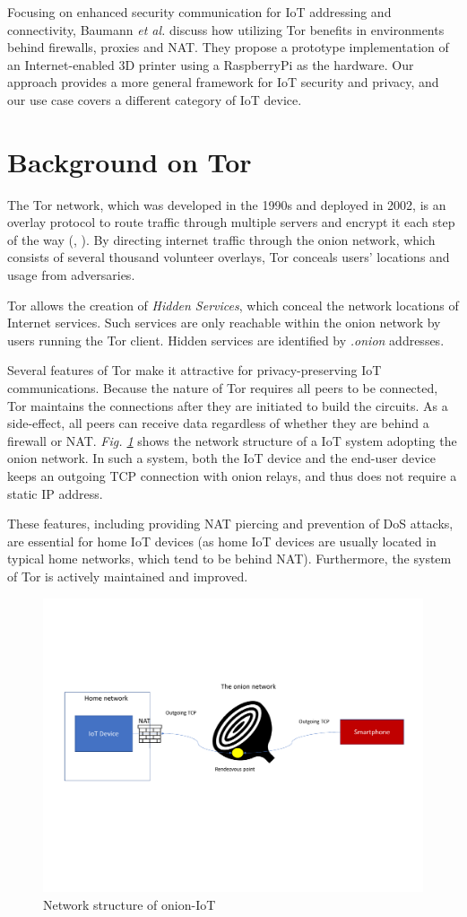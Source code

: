 Focusing on enhanced security communication for IoT addressing and connectivity, Baumann \textit{et al.} \cite{baumann2018utilising} discuss how utilizing Tor benefits in environments behind firewalls, proxies and NAT. They propose a prototype implementation of an Internet-enabled 3D printer using a RaspberryPi as the hardware. Our approach provides a more general framework for IoT security and privacy, and our use case covers a different category of IoT device.

\section{Background on Tor}
\label{sec:torbackground}
The Tor network, which was developed in the 1990s and deployed in 2002, is an overlay protocol to route traffic through multiple servers and encrypt it each step of the way (\cite{torproject}, \cite{chaabane2010digging}). By directing internet traffic through the onion network, which consists of several thousand volunteer overlays, Tor conceals users' locations and usage from adversaries.

Tor allows the creation of \textit{Hidden Services}, which conceal the network locations of Internet services. Such services are only reachable within the onion network by users running the Tor client. Hidden services are identified by \textit{.onion} addresses.

Several features of Tor make it attractive for privacy-preserving IoT communications. Because the nature of Tor requires all peers to be connected, Tor maintains the connections after they are initiated to build the circuits. As a side-effect, all peers can receive data regardless of whether they are behind a firewall or NAT. \textit{Fig. \ref{fig:natpiercing}} shows the network structure of a IoT system adopting the onion network. In such a system, both the IoT device and the end-user device keeps an outgoing TCP connection with onion relays, and thus does not require a static IP address.

These features, including providing NAT piercing and prevention of DoS attacks, are essential for home IoT devices (as home IoT devices are usually located in typical home networks, which tend to be behind NAT). Furthermore, the system of Tor is actively maintained and improved.

\begin{figure}
	\includegraphics[width=\linewidth]{natpiercing.pdf}
	\caption{Network structure of onion-IoT}
	\label{fig:natpiercing}
\end{figure}